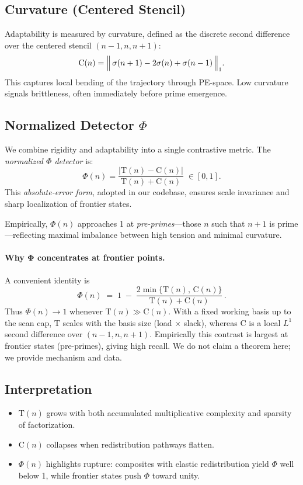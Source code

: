 \documentclass[11pt]{article}
\theoremstyle{plain}
\theoremstyle{definition}
\newcommand{\tension}{\mathrm{T}}                           %
\newcommand{\curv}{\mathrm{C}}                              %
\newcommand{\phidet}{\Phi}                                  %
\begin{document}
\subsection{Curvature (Centered Stencil)}
Adaptability is measured by curvature, defined as the discrete second difference over the centered stencil $(n-1,n,n+1)$:
\[
\curv(n) = \Bigl\|\, \sigma(n+1) - 2\sigma(n) + \sigma(n-1) \,\Bigr\|_1.
\]
This captures local bending of the trajectory through PE-space. Low curvature signals brittleness, often immediately before prime emergence.

\subsection{Normalized Detector $\Phi$}
We combine rigidity and adaptability into a single contrastive metric. The \emph{normalized $\Phi$ detector} is:
\[
\phidet(n) = \frac{|\tension(n) - \curv(n)|}{\tension(n) + \curv(n)} \;\in [0,1].
\]
This \emph{absolute-error form}, adopted in our codebase, ensures scale invariance and sharp localization of frontier states.  

Empirically, $\phidet(n)$ approaches 1 at \emph{pre-primes}—those $n$ such that $n+1$ is prime—reflecting maximal imbalance between high tension and minimal curvature.

\paragraph{Why $\boldsymbol{\Phi}$ concentrates at frontier points.}
A convenient identity is
\[
\phidet(n) \;=\; 1 \;-\; \frac{2\min\{\tension(n),\,\curv(n)\}}{\tension(n)+\curv(n)}\,.
\]
Thus $\phidet(n)\to 1$ whenever $\tension(n)\gg \curv(n)$. With a fixed working basis up to the scan cap, $\tension$ scales with the basis size (load $\times$ slack), whereas $\curv$ is a local $L^1$ second difference over $(n\!-\!1,n,n\!+\!1)$. Empirically this contrast is largest at frontier states (pre-primes), giving high recall. We do not claim a theorem here; we provide mechanism and data.

\subsection{Interpretation}
\begin{itemize}
  \item $\tension(n)$ grows with both accumulated multiplicative complexity and sparsity of factorization.
  \item $\curv(n)$ collapses when redistribution pathways flatten.
  \item $\phidet(n)$ highlights rupture: composites with elastic redistribution yield $\Phi$ well below 1, while frontier states push $\Phi$ toward unity.
\end{itemize}
\end{document}
